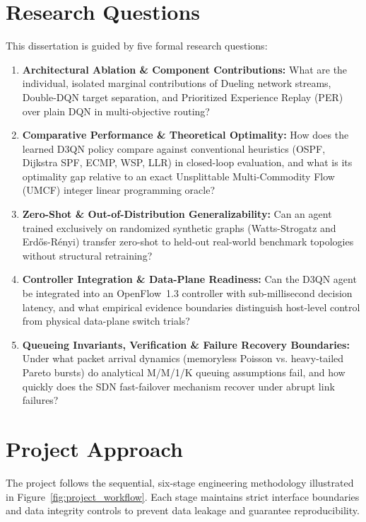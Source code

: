 \documentclass[12pt,a4paper,oneside]{report}
\begin{document}
\section{Research Questions}
This dissertation is guided by five formal research questions:
\begin{enumerate}[label=\textbf{RQ\arabic*:},leftmargin=18mm]
  \item \textbf{Architectural Ablation \& Component Contributions:} What are the individual, isolated marginal contributions of Dueling network streams, Double-DQN target separation, and Prioritized Experience Replay (PER) over plain DQN in multi-objective routing?
  \item \textbf{Comparative Performance \& Theoretical Optimality:} How does the learned D3QN policy compare against conventional heuristics (OSPF, Dijkstra SPF, ECMP, WSP, LLR) in closed-loop evaluation, and what is its optimality gap relative to an exact Unsplittable Multi-Commodity Flow (UMCF) integer linear programming oracle?
  \item \textbf{Zero-Shot \& Out-of-Distribution Generalizability:} Can an agent trained exclusively on randomized synthetic graphs (Watts-Strogatz and Erd\H{o}s-R\'enyi) transfer zero-shot to held-out real-world benchmark topologies without structural retraining?
  \item \textbf{Controller Integration \& Data-Plane Readiness:} Can the D3QN agent be integrated into an OpenFlow~1.3 controller with sub-millisecond decision latency, and what empirical evidence boundaries distinguish host-level control from physical data-plane switch trials?
  \item \textbf{Queueing Invariants, Verification \& Failure Recovery Boundaries:} Under what packet arrival dynamics (memoryless Poisson vs. heavy-tailed Pareto bursts) do analytical M/M/1/K queuing assumptions fail, and how quickly does the SDN fast-failover mechanism recover under abrupt link failures?
\end{enumerate}

\section{Project Approach}
The project follows the sequential, six-stage engineering methodology illustrated in Figure~\ref{fig:project_workflow}. Each stage maintains strict interface boundaries and data integrity controls to prevent data leakage and guarantee reproducibility.
\end{document}
